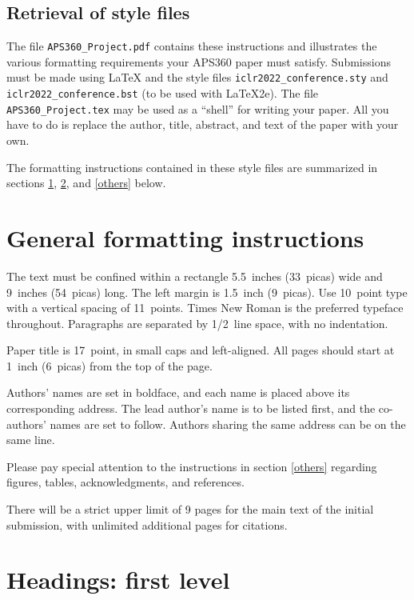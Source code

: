 \documentclass{article} %
\begin{document}
\subsection{Retrieval of style files}

The file \verb+APS360_Project.pdf+ contains these
instructions and illustrates the various formatting requirements your APS360 paper must satisfy.
Submissions must be made using \LaTeX{} and the style files
\verb+iclr2022_conference.sty+ and \verb+iclr2022_conference.bst+ (to be used with \LaTeX{}2e). The file
\verb+APS360_Project.tex+ may be used as a ``shell'' for writing your paper. All you have to do is replace the author, title, abstract, and text of the paper with
your own.

The formatting instructions contained in these style files are summarized in
sections \ref{gen_inst}, \ref{headings}, and \ref{others} below.

\section{General formatting instructions}
\label{gen_inst}

The text must be confined within a rectangle 5.5~inches (33~picas) wide and
9~inches (54~picas) long. The left margin is 1.5~inch (9~picas).
Use 10~point type with a vertical spacing of 11~points. Times New Roman is the
preferred typeface throughout. Paragraphs are separated by 1/2~line space,
with no indentation.

Paper title is 17~point, in small caps and left-aligned.
All pages should start at 1~inch (6~picas) from the top of the page.

Authors' names are
set in boldface, and each name is placed above its corresponding
address. The lead author's name is to be listed first, and
the co-authors' names are set to follow. Authors sharing the
same address can be on the same line.

Please pay special attention to the instructions in section \ref{others}
regarding figures, tables, acknowledgments, and references.


There will be a strict upper limit of 9 pages for the main text of the initial submission, with unlimited additional pages for citations. 

\section{Headings: first level}
\label{headings}
\end{document}
